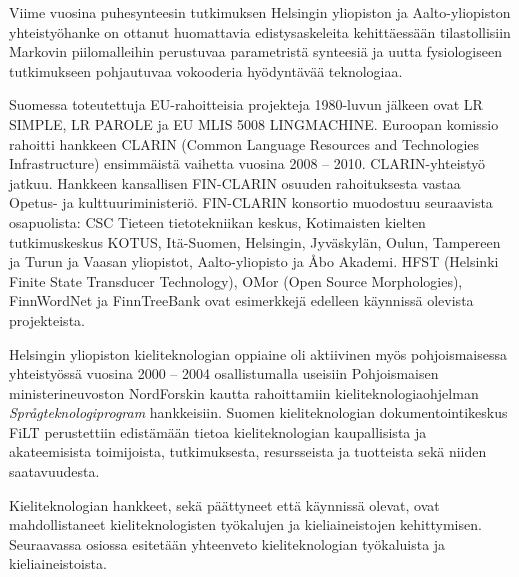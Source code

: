 \documentclass{../../metanetpaper}
\begin{document}
\begin{Parallel}[c]{79mm}{78mm}
{Viime vuosina puhesynteesin tutkimuksen Helsingin yliopiston ja
Aalto-yliopiston yhteistyöhanke on ottanut huomattavia
edistysaskeleita kehittäessään tilastollisiin Markovin piilomalleihin
perustuvaa parametristä synteesiä ja uutta fysiologiseen tutkimukseen
pohjautuvaa vokooderia hyödyntävää teknologiaa.

Suomessa toteutettuja EU-rahoitteisia projekteja 1980-luvun jälkeen
ovat LR SIMPLE, LR PAROLE ja EU MLIS 5008 LINGMACHINE. Euroopan
komissio rahoitti hankkeen CLARIN (Common Language Resources and
Technologies Infrastructure) ensimmäistä vaihetta vuosina 2008 –
2010. CLARIN-yhteistyö jatkuu. Hankkeen kansallisen FIN-CLARIN osuuden
rahoituksesta vastaa Opetus- ja kulttuuriministeriö. FIN-CLARIN
konsortio muodostuu seuraavista osapuolista: CSC Tieteen
tietotekniikan keskus, Kotimaisten kielten tutkimuskeskus KOTUS,
Itä-Suomen, Helsingin, Jyväskylän, Oulun, Tampereen ja Turun ja Vaasan
yliopistot, Aalto-yliopisto ja Åbo Akademi. HFST (Helsinki Finite
State Transducer Technology), OMor (Open Source Morphologies),
FinnWordNet ja FinnTreeBank ovat esimerkkejä edelleen käynnissä
olevista projekteista.

Helsingin yliopiston kieliteknologian oppiaine oli aktiivinen myös
pohjoismaisessa yhteistyössä vuosina 2000 – 2004 osallistumalla
useisiin Pohjoismaisen ministerineuvoston NordForskin kautta
rahoittamiin kieliteknologiaohjelman \textit{Språgteknologiprogram}
hankkeisiin. Suomen kieliteknologian dokumentointikeskus FiLT
perustettiin edistämään tietoa kieliteknologian kaupallisista ja
akateemisista toimijoista, tutkimuksesta, resursseista ja tuotteista
sekä niiden saatavuudesta.

Kieliteknologian hankkeet, sekä päättyneet että käynnissä olevat, ovat
mahdollistaneet kieliteknologisten työkalujen ja kieliaineistojen
kehittymisen.  Seuraavassa osiossa esitetään yhteenveto
kieliteknologian työkaluista ja kieliaineistoista.
}

\end{Parallel}
\end{document}
